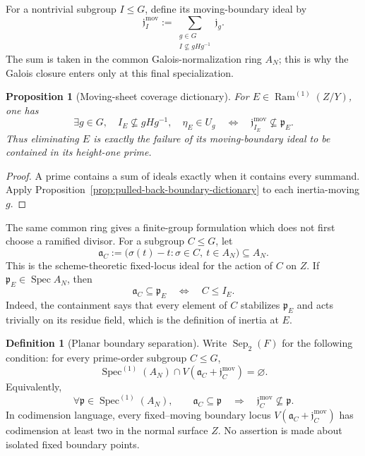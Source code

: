 \documentclass[11pt]{article}
\newtheorem{proposition}[theorem]{Proposition}
\theoremstyle{remark}
\theoremstyle{definition}
\newtheorem{definition}[theorem]{Definition}
\DeclareMathOperator{\Spec}{Spec}
\DeclareMathOperator{\Ram}{Ram}
\begin{document}
For a nontrivial subgroup \(I\leq G\), define its moving-boundary ideal by
\[
  \mathfrak j_I^{\mathrm{mov}}
  :=
  \sum_{\substack{g\in G\\I\nsubseteq gHg^{-1}}}\mathfrak j_g.
\]
The sum is taken in the common Galois-normalization ring \(A_N\); this is
why the Galois closure enters only at this final specialization.

\begin{proposition}[Moving-sheet coverage dictionary]
\label{prop:moving-sheet-coverage-dictionary}
For \(E\in\Ram^{(1)}(Z/Y)\), one has
\[
  \exists g\in G,\quad
  I_E\nsubseteq gHg^{-1},\quad \eta_E\in U_g
  \quad\Longleftrightarrow\quad
  \mathfrak j_{I_E}^{\mathrm{mov}}\nsubseteq\mathfrak p_E.
\]
Thus eliminating \(E\) is exactly the failure of its moving-boundary
ideal to be contained in its height-one prime.
\end{proposition}

\begin{proof}
A prime contains a sum of ideals exactly when it contains every summand.
Apply Proposition~\ref{prop:pulled-back-boundary-dictionary} to each
inertia-moving \(g\).
\end{proof}

The same common ring gives a finite-group formulation which does not first
choose a ramified divisor.  For a subgroup \(C\leq G\), let
\[
  \mathfrak a_C
  :=
  \bigl(\sigma(t)-t:\sigma\in C,\ t\in A_N\bigr)
  \subseteq A_N.
\]
This is the scheme-theoretic fixed-locus ideal for the action of \(C\) on
\(Z\).  If \(\mathfrak p_E\in\Spec A_N\), then
\[
  \mathfrak a_C\subseteq\mathfrak p_E
  \quad\Longleftrightarrow\quad
  C\leq I_E.
\]
Indeed, the containment says that every element of \(C\) stabilizes
\(\mathfrak p_E\) and acts trivially on its residue field, which is the
definition of inertia at \(E\).

\begin{definition}[Planar boundary separation]
\label{def:planar-boundary-separation}
Write \(\operatorname{Sep}_2(F)\) for the following condition: for every
prime-order subgroup \(C\leq G\),
\[
  \Spec^{(1)}(A_N)
  \cap
  V\!\left(\mathfrak a_C+\mathfrak j_C^{\mathrm{mov}}\right)
  =\varnothing.
\]
Equivalently,
\[
  \forall\mathfrak p\in\Spec^{(1)}(A_N),\qquad
  \mathfrak a_C\subseteq\mathfrak p
  \quad\Longrightarrow\quad
  \mathfrak j_C^{\mathrm{mov}}\nsubseteq\mathfrak p.
\]
In codimension language, every fixed--moving boundary locus
\(V(\mathfrak a_C+\mathfrak j_C^{\mathrm{mov}})\) has codimension at least
two in the normal surface \(Z\).  No assertion is made about isolated
fixed boundary points.
\end{definition}
\end{document}
